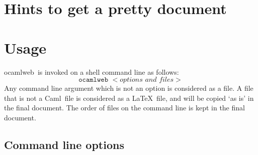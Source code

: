\documentclass[12pt]{article}
\newcommand{\Caml}{\textsf{Caml}}
\newcommand{\ocamlweb}{\textsf{ocamlweb}}
\begin{document}

\section{Hints to get a pretty document}



\section{Usage}

\ocamlweb\ is invoked on a shell command line as follows:
\begin{displaymath}
  \texttt{ocamlweb }<\textit{options and files}>
\end{displaymath}
Any command line argument which is not an option is considered as a
file. A file that is not a \Caml\ file is considered as a \LaTeX\ file,
and will be copied `as is' in the final document. The order of files
on the command line is kept in the final document. 

\subsection*{Command line options}
\end{document}
